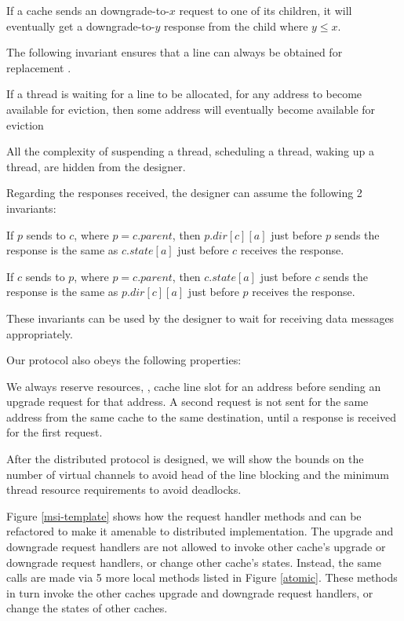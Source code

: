 \begin{theorem}
If a cache sends an downgrade-to-$x$ request to one of its children, it will
eventually get a downgrade-to-$y$ response from the child where $y \le x$.
\label{willRecv2}
\end{theorem}

The following invariant ensures that a line can always be obtained for
replacement .
\begin{theorem}
If a thread is waiting for a line to be allocated, \ie for any address to become
available for eviction, then some address will eventually become available for
eviction
\label{evictDead}
\end{theorem}

All the complexity of suspending a thread, scheduling a thread, waking up a
thread, \etc are hidden from the designer.

Regarding the responses received, the designer can assume the following 2
invariants:

\begin{theorem}
If $p$ sends  to $c$, where $p = c.parent$, then $p.dir[c][a]$
just before $p$ sends the response is the same as $c.state[a]$ just before $c$
receives the response.
\label{pcSame}
\end{theorem}

\begin{theorem}
If $c$ sends  to $p$, where $p = c.parent$, then $c.state[a]$
just before $c$ sends the response is the same as $p.dir[c][a]$ just before $p$
receives the response.
\label{cpSame}
\end{theorem}

These invariants can be used by the designer to wait for receiving data messages
appropriately.


Our protocol also obeys the following properties:

We always reserve resources, \eg, cache line slot for an address before sending
an upgrade request for that address.
A second request is not sent for the same address from the same cache to the same
destination, until a response is received for the first request.

After the distributed protocol is designed, we
will show the bounds on the number of virtual channels to avoid head of the
line blocking and the minimum thread resource requirements to avoid deadlocks.



Figure \ref{msi-template} shows how the request handler methods \uReq{} and
\dReq{} can be refactored to make it amenable to distributed implementation. The
upgrade and downgrade request handlers are not allowed to invoke other cache's
upgrade or downgrade request handlers, or change other cache's states. Instead,
the same calls are made via 5 more local methods listed in Figure \ref{atomic}.
These methods in turn invoke the other caches upgrade and downgrade request
handlers, or change the states of other caches.

